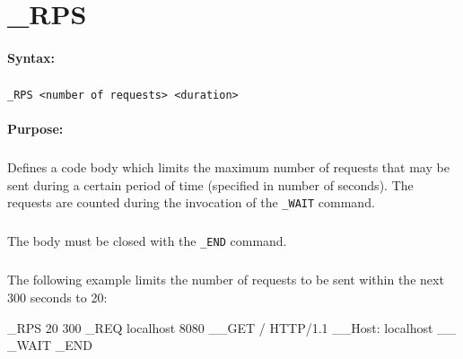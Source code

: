 
\newpage
\section{\_RPS}
\label{cmd:_RPS}

\paragraph{Syntax:}
\subparagraph{}
\texttt{\_RPS <number of requests> <duration>}

\paragraph{Purpose:}
\subparagraph{}
Defines a code body which limits the maximum number of requests 
that may be sent during a certain period of time (specified in number of seconds). 
The requests are counted during the invocation of the \texttt{\_WAIT} command.

\subparagraph{}
The body must be closed with the \texttt{\_END} command.

\subparagraph{}
The following example limits the number of requests to be sent within 
the next 300 seconds to 20:

\begin{usplisting}
    _RPS 20 300
    _REQ localhost 8080
    __GET / HTTP/1.1
    __Host: localhost
    __
    _WAIT
    _END
\end{usplisting}
